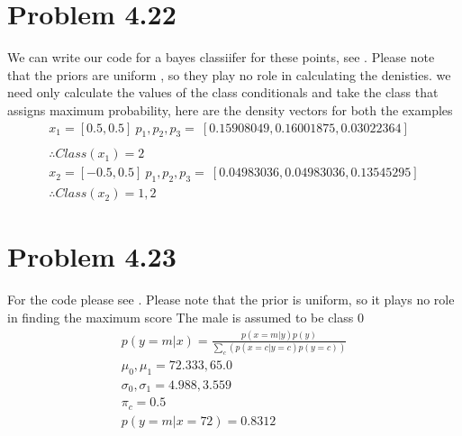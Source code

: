 \section{Problem 4.22}
We can write our code for a bayes classiifer for these points, see \cite{CS3390}. Please note that the 
priors are uniform , so they play no role in calculating the denisties.
we need only calculate the values of the class conditionals and take the class that assigns maximum probability,
here are the density vectors for both the examples
\begin{gather}
    x_1 = [0.5, 0.5] \ p_1, p_2, p_3  = \    [0.15908049 , 0.16001875,  0.03022364] \\
    \\
    \therefore   Class(x_1) = 2
    \\
    x_2 = [-0.5, 0.5] \ p_1, p_2, p_3 = \ [0.04983036 , 0.04983036,  0.13545295]
    \\
    \therefore Class(x_2) = 1,2
\end{gather}
\section{Problem 4.23}
For the code please see \cite{CS3390}.
Please note that the prior is uniform, so it plays no role in finding the maximum score
The male is assumed to be class 0 
\begin{gather}
    p(y = m | x) = \frac{p(x = m | y)p(y)}{\sum_c ( p ( x = c | y  = c)p(y =c))}
    \\
    \mu_0 , \mu_1 = 72.333, 65.0
    \\
    \sigma_0 , \sigma_1  = 4.988, 3.559
    \\
    \pi_c = 0.5
    \\
    p(y  = m | x = 72) = 0.8312
\end{gather}


